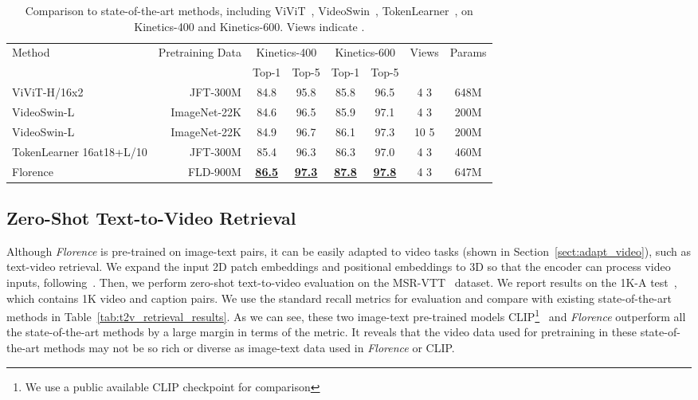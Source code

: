 \documentclass{article}
\begin{document}
\begin{table*}[ht]
\centering
\setlength{\tabcolsep}{12pt}
\small
\renewcommand{\arraystretch}{1.35}
\begin{tabular}{l|r|cc|cc|c|c}
\toprule
\multirow{2}{*}{Method} & \multirow{2}{*}{Pretraining Data} & \multicolumn{2}{c|}{Kinetics-400} &
\multicolumn{2}{c|}{Kinetics-600} & \multirow{2}{*}{Views} & \multirow{2}{*}{Params}\\
& & Top-1 & Top-5 & Top-1 & Top-5 & & \\
\midrule
ViViT-H/16x2 & JFT-300M & 84.8 & 95.8 & 85.8 & 96.5 & 4  3 & 648M\\
VideoSwin-L & ImageNet-22K & 84.6 & 96.5 & 85.9 & 97.1 & 4  3 & 200M \\
VideoSwin-L & ImageNet-22K & 84.9 & 96.7 & 86.1 & 97.3 & 10  5 & 200M
\\
TokenLearner 16at18+L/10 & JFT-300M & 85.4 & 96.3 & 86.3 & 97.0 & 4
 3 & 460M \\
Florence & FLD-900M & \underline{\bf{86.5}} & \underline{\bf{97.3}} & \underline{\bf{87.8}} &
\underline{\bf{97.8}} & 4  3 & 647M \\
\bottomrule
\end{tabular}
\caption{Comparison to state-of-the-art methods, including ViViT~\cite{arnab2021vivit}, VideoSwin~\cite{liu2021video}, TokenLearner~\cite{ryoo2021tokenlearner}, on Kinetics-400 and Kinetics-600. Views indicate . }
\label{tab:k400}
\end{table*}


\subsection{Zero-Shot Text-to-Video Retrieval}

Although \emph{Florence} is pre-trained on image-text pairs, it can be easily adapted to video tasks
(shown in Section~\ref{sect:adapt_video}), such as text-video retrieval. We expand the input 2D
patch embeddings and positional embeddings to 3D so that the encoder can process video inputs,
following~\cite{arnab2021vivit}. Then, we perform zero-shot text-to-video evaluation on the
MSR-VTT~\cite{xu2016msr} dataset. We report results on the 1K-A test~\cite{yu2018joint}, which
contains 1K video and caption pairs. We use the standard recall metrics for evaluation and compare
with existing state-of-the-art methods in Table~\ref{tab:t2v_retrieval_results}. As we can see, these
two image-text pre-trained models CLIP\footnote{We use a public available CLIP checkpoint for
comparison}~\cite{radford2021learning} and \emph{Florence} outperform all the state-of-the-art
methods by a large margin in terms of the  metric. It reveals that the video data used for
pretraining in these state-of-the-art methods may not be so rich or diverse as image-text data used
in \emph{Florence} or CLIP.
\end{document}
